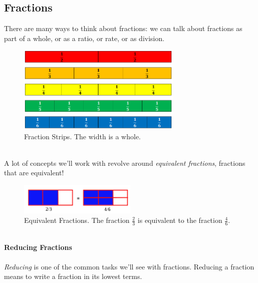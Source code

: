 \newpage 

\vspace*{25mm} 
\newcommand*{\xMin}{0}%
\newcommand*{\xMax}{10}%
\newcommand*{\yMin}{0}%
\newcommand*{\yMax}{10}%
\hspace{-15mm}



\newpage 
\subsection{Fractions}
There are many ways to think about fractions: we can talk about fractions as part of a whole, or as a ratio, or rate, or as division.  
\begin{figure}[h!]
    \centering
    \includegraphics[width=0.7\textwidth]{img/FractionStrips.png}  
    \caption{Fraction Strips. The width is a whole.}
    \label{fig:fraction-strips}
\end{figure}
\\
A lot of concepts we'll work with revolve around \emph{equivalent fractions}, fractions that are equivalent!
\begin{figure}[h!]
    \centering
    \includegraphics[width=0.5\textwidth]{img/fraction2-3.png}
    \caption{Equivalent Fractions.  The fraction \(\frac{2}{3}\) is equivalent to the fraction \(\frac{4}{6}\).}
    \label{fig:equivalent-fractions}
\end{figure}
\\ 
\textbf{Reducing Fractions}
\\ \\ 
\emph{Reducing} is one of the common tasks we'll see with fractions.  Reducing a fraction means to write a fraction in its lowest terms.  




